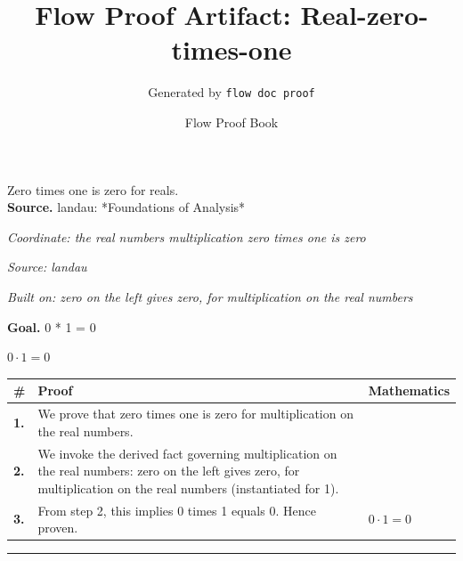 \documentclass[11pt]{article}
\title{Flow Proof Artifact: Real-zero-times-one}
\author{Generated by \texttt{flow doc proof}}
\date{Flow Proof Book}
\theoremstyle{definition}
\begin{document}
\maketitle
Zero times one is zero for reals.\\[0.5em]
\textbf{Source.} landau: *Foundations of Analysis*\\[0.5em]
\bigskip
{}\par
\smallskip\noindent\textit{Coordinate: the real numbers \cdot multiplication \cdot zero times one is zero}\par
\smallskip\noindent\textit{Source: landau}\par
\smallskip\noindent\textit{Built on: zero on the left gives zero, for multiplication on the real numbers}\par
\medskip
\noindent\textbf{Goal.} 0 * 1 = 0\par
\noindent$\displaystyle 0 \cdot 1 = 0$\par
\medskip
\noindent
\begin{tabular}{@{} >{\raggedright\arraybackslash}p{} >{\raggedright\arraybackslash}p{} >{\raggedleft\arraybackslash}p{} @{}}
\textbf{\#} & \textbf{Proof} & \textbf{Mathematics} \\
\midrule
\textbf{1.} & We prove that zero times one is zero for multiplication on the real numbers. & \\[0.45em]
\textbf{2.} & We invoke the derived fact governing multiplication on the real numbers: zero on the left gives zero, for multiplication on the real numbers (instantiated for 1). & \\[0.45em]
\textbf{3.} & From step 2, this implies 0 times 1 equals 0. Hence proven. & $\displaystyle 0 \cdot 1 = 0$ \\[0.45em]
\bottomrule
\end{tabular}
\label{thm:Real-multiplication-zero_times_one_is_zero}
\par\medskip\hrule
\end{document}
